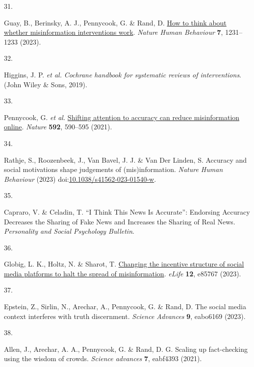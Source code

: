 \documentclass[
  man]{apa6}
\newlength{\cslhangindent}
\newlength{\csllabelwidth}
\newenvironment{CSLReferences}[2] %
 {\begin{list}{}{%
  \setlength{\itemindent}{0pt}
  \setlength{\leftmargin}{0pt}
  \setlength{\parsep}{0pt}
  \ifodd #1
   \setlength{\leftmargin}{\cslhangindent}
   \setlength{\itemindent}{-1\cslhangindent}
  \fi
  \setlength{\itemsep}{#2\baselineskip}}}
 {\end{list}}
\newcommand{\CSLLeftMargin}[1]{\parbox[t]{\csllabelwidth}{\strut#1\strut}}
\newcommand{\CSLRightInline}[1]{\parbox[t]{\linewidth - \csllabelwidth}{\strut#1\strut}}
\begin{document}
\begin{CSLReferences}{0}{0}
\CSLLeftMargin{31. }%
\CSLRightInline{Guay, B., Berinsky, A. J., Pennycook, G. \& Rand, D. \href{https://doi.org/10.1038/s41562-023-01667-w}{How to think about whether misinformation interventions work}. \emph{Nature Human Behaviour} \textbf{7}, 1231--1233 (2023).}

\CSLLeftMargin{32. }%
\CSLRightInline{Higgins, J. P. \emph{et al.} \emph{Cochrane handbook for systematic reviews of interventions}. (John Wiley \& Sons, 2019).}

\CSLLeftMargin{33. }%
\CSLRightInline{Pennycook, G. \emph{et al.} \href{https://doi.org/10.1038/s41586-021-03344-2}{Shifting attention to accuracy can reduce misinformation online}. \emph{Nature} \textbf{592}, 590--595 (2021).}

\CSLLeftMargin{34. }%
\CSLRightInline{Rathje, S., Roozenbeek, J., Van Bavel, J. J. \& Van Der Linden, S. Accuracy and social motivations shape judgements of (mis)information. \emph{Nature Human Behaviour} (2023) doi:\href{https://doi.org/10.1038/s41562-023-01540-w}{10.1038/s41562-023-01540-w}.}

\CSLLeftMargin{35. }%
\CSLRightInline{Capraro, V. \& Celadin, T. {``}I Think This News Is Accurate{''}: Endorsing Accuracy Decreases the Sharing of Fake News and Increases the Sharing of Real News. \emph{Personality and Social Psychology Bulletin}.}

\CSLLeftMargin{36. }%
\CSLRightInline{Globig, L. K., Holtz, N. \& Sharot, T. \href{https://doi.org/10.7554/eLife.85767}{Changing the incentive structure of social media platforms to halt the spread of misinformation}. \emph{eLife} \textbf{12}, e85767 (2023).}

\CSLLeftMargin{37. }%
\CSLRightInline{*Epstein, Z., Sirlin, N., Arechar, A., Pennycook, G. \& Rand, D. The social media context interferes with truth discernment. \emph{Science Advances} \textbf{9}, eabo6169 (2023).}

\CSLLeftMargin{38. }%
\CSLRightInline{*Allen, J., Arechar, A. A., Pennycook, G. \& Rand, D. G. Scaling up fact-checking using the wisdom of crowds. \emph{Science advances} \textbf{7}, eabf4393 (2021).}


\end{CSLReferences}
\end{document}
